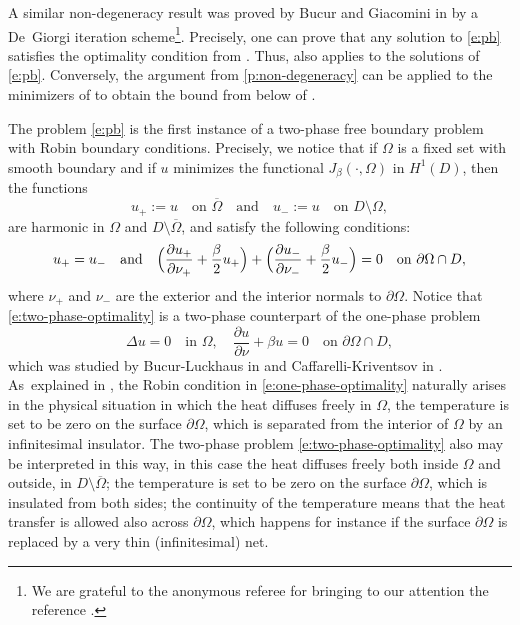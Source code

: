 \documentclass[JEP,XML,SOM,Unicode]{cedram}
\theoremstyle{plain}
\theoremstyle{definition}
\begin{document}
A similar non-degeneracy result was proved by Bucur and Giacomini in \cite{bg} by a De~Giorgi iteration scheme\footnote{We are grateful to the anonymous referee for bringing to our attention the reference \cite{bg}.}. Precisely, one can prove that any solution to \eqref{e:pb} satisfies the optimality condition from \cite[Rem.\,3.7]{bg}. Thus, \cite[Th.\,3.5]{bg} also applies to the solutions of \eqref{e:pb}. Conversely, the argument from \ref{p:non-degeneracy} can be applied to the minimizers of \cite{bg} to obtain the bound from below of \cite[Th.\,3.5]{bg}.

The problem \eqref{e:pb} is the first instance of a two-phase free boundary problem with Robin boundary conditions. Precisely, we notice that if $\Omega$ is a fixed set with smooth boundary and if $u$ minimizes the functional $J_\beta(\cdot,\Omega)$ in $H^1(D)$, then the functions
\[u_+:=u\quad\text{on } \overline\Omega\quad\text{and}\quad u_-:=u\quad\text{on } D\setminus\Omega,\]
are harmonic in $\Omega$ and $D\setminus\overline\Omega$, and satisfy the following conditions:
\begin{equation}\label{e:two-phase-optimality}
u_+=u_-\quad\text{and}\quad\Bigl(\frac{\partial u_+}{\partial \nu_+}+\frac\beta2 u_+\Bigr)+\Bigl(\frac{\partial u_-}{\partial \nu_-}+\frac\beta2u_-\Bigr)=0\quad\text{on } \partial\Omega\cap D,
\end{equation}
where $\nu_+$ and $\nu_-$ are the exterior and the interior normals to $\partial\Omega$. Notice that \eqref{e:two-phase-optimality} is a two-phase counterpart of the one-phase problem
\begin{equation}\label{e:one-phase-optimality}
\Delta u=0\quad\text{in }\Omega,\quad \frac{\partial u}{\partial \nu}+\beta u=0\quad\text{on } \partial\Omega\cap D,
\end{equation}
which was studied by Bucur-Luckhaus in \cite{bl} and Caffarelli-Kriventsov in \cite{ck}. As~\hbox{explained} in \cite{ck}, the Robin condition in \eqref{e:one-phase-optimality} naturally arises in the physical situation in which the heat diffuses freely in $\Omega$, the temperature is set to be zero on the surface $\partial\Omega$, which is separated from the interior of $\Omega$ by an infinitesimal insulator. The two-phase problem \eqref{e:two-phase-optimality} also may be interpreted in this way, in this case the heat diffuses freely both inside $\Omega$ and outside, in $D\setminus\overline\Omega$; the temperature is set to be zero on the surface $\partial\Omega$, which is insulated from both sides; the continuity of the temperature means that the heat transfer is allowed also across $\partial\Omega$, which happens for instance if the surface $\partial\Omega$ is replaced by a very thin (infinitesimal) net.
\end{document}
